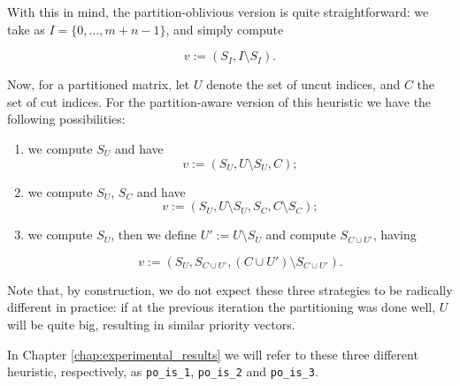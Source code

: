 With this in mind, the partition-oblivious version is quite straightforward: we take as $I = \{ 0,\dots,m+n-1\}$, and simply compute

\[
	v := (S_I,I \setminus S_I).
\]

Now, for a partitioned matrix, let $U$ denote the set of uncut indices, and $C$ the set of cut indices. For the partition-aware version of this heuristic we have the following possibilities:

\begin{enumerate}
	\item we compute $S_U$ and have 
\[
	v := (S_U,U \setminus S_U, C);
\]

	\item we compute $S_U$, $S_C$ and have
\[
		v := (S_U, U \setminus S_U, S_C, C \setminus S_C);
\]

	\item we compute $S_U$, then we define $U' := U \setminus S_U$ and compute $S_{C \cup U'}$, having

		\[
			v:= (S_U, S_{C \cup U'}, (C \cup U') \setminus S_{C \cup U'}).
		\]
\end{enumerate}

Note that, by construction, we do not expect these three strategies to be radically different in practice: if at the previous iteration the partitioning was done well, $U$ will be quite big, resulting in similar priority vectors.

In Chapter \ref{chap:experimental_results} we will refer to these three different heuristic, respectively, as \verb|po_is_1|, \verb|po_is_2| and \verb|po_is_3|.
